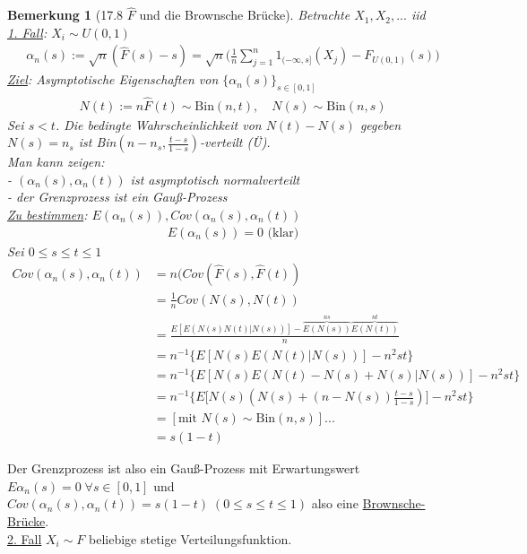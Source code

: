 \documentclass[a4paper,openany]{book}
\theoremstyle{mytheoremstyle}
\newtheorem*{bem}{Bemerkung}
\theoremstyle{mytheoremstyle2}
\begin{document}
\begin{bem}[17.8 $\hat{F} $ und die Brownsche Brücke]
  Betrachte $X_1,X_2,... $ iid \\
  \underline{1. Fall}: $X_i\sim U(0,1) $
  \begin{align*}
    \alpha _n(s):=\sqrt{n}(\hat{F}(s)-s)=\sqrt{n}\bigg(\frac{1}{n}\sum_{j=1}^{n}{1 _{(-\infty ,s]}(X_j)}-F _{U(0,1)}(s)\bigg)
  \end{align*}
  \underline{Ziel}: Asymptotische Eigenschaften von $\{\alpha _n(s)\}_{s \in [0,1]} $ 
  \begin{align*}
    N(t):=n \hat{F}(t)\sim \text{Bin}(n,t),\quad N(s)\sim \text{Bin}(n,s)
  \end{align*}
  Sei $s<t $. Die bedingte Wahrscheinlichkeit von $N(t)-N(s) $ gegeben $N(s)=n_s $ ist Bin$(n-n_s,\frac{t-s}{1-s}) $-verteilt (Ü).\\
  Man kann zeigen: \\
  - $(\alpha _n(s),\alpha _n(t)) $ ist asymptotisch normalverteilt \\
  - der Grenzprozess ist ein Gauß-Prozess \\
  \underline{Zu bestimmen}: $E(\alpha _n(s)),Cov(\alpha _n(s),\alpha _n(t)) $
  \begin{align*}
    E(\alpha _n(s))=0 \text{ (klar)}
  \end{align*}
  Sei $0 \leq s \leq t \leq 1 $
  \begin{align*}
    Cov(\alpha _n(s),\alpha _n(t))
    &=n(Cov (\hat{F}(s),\hat{F}(t))\\
    &=\frac{1}{n}Cov (N(s),N(t))\\
    &=\frac{E[E(N(s)N(t)|N(s))]-\overbrace{E(N(s))}^{ns} \overbrace{E(N(t))}^{nt} }{n}\\
    &=n ^{-1}\{E[N(s)E(N(t)|N(s))]-n^2st\}\\
    &=n ^{-1}\{E[N(s)E(N(t)-N(s)+N(s)|N(s))]-n^2st\}\\
    &=n ^{-1}\{E\bigg[N(s)(N(s)+(n-N(s))\frac{t-s}{1-s})\bigg]-n^2st\}\\
    &=[\text{mit }N(s)\sim \text{Bin}(n,s)]...\\
    &=s(1-t)
  \end{align*}
\end{bem}
Der Grenzprozess ist also ein Gauß-Prozess mit Erwartungswert $E\alpha _n(s)=0\;\forall s \in [0,1] $ und $Cov(\alpha _n(s),\alpha _n(t))=s(1-t)\;(0 \leq s \leq t \leq 1) $ also eine \underline{Brownsche-Brücke}. \\
\underline{2. Fall} $X_i\sim F $ beliebige stetige Verteilungsfunktion.\\
\end{document}
